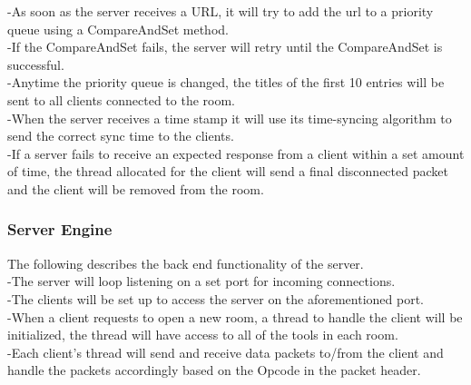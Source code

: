 \documentclass{article}
\begin{document}
-As soon as the server receives a URL, it will try to add the url to a priority queue using a CompareAndSet method.\\

-If the CompareAndSet fails, the server will retry until the CompareAndSet is successful. \\

-Anytime the priority queue is changed, the titles of the first 10 entries will be sent to all clients connected to the room.\\

-When the server receives a time stamp it will use its time-syncing algorithm to send the correct sync time to the clients. \\

-If a server fails to receive an expected response from a client within a set amount of time, the thread allocated for the client will send a final disconnected packet and the client will be removed from the room.\\

\subsubsection{Server Engine}
The following describes the back end functionality of the server.\\

-The server will loop listening on a set port for incoming connections.\\

-The clients will be set up to access the server on the aforementioned port.\\

-When a client requests to open a new room, a thread to handle the client will be initialized, the thread will have access to all of the tools in each room.\\

-Each client's thread will send and receive data packets to/from the client and handle the packets accordingly based on the Opcode in the packet header.
\end{document}
